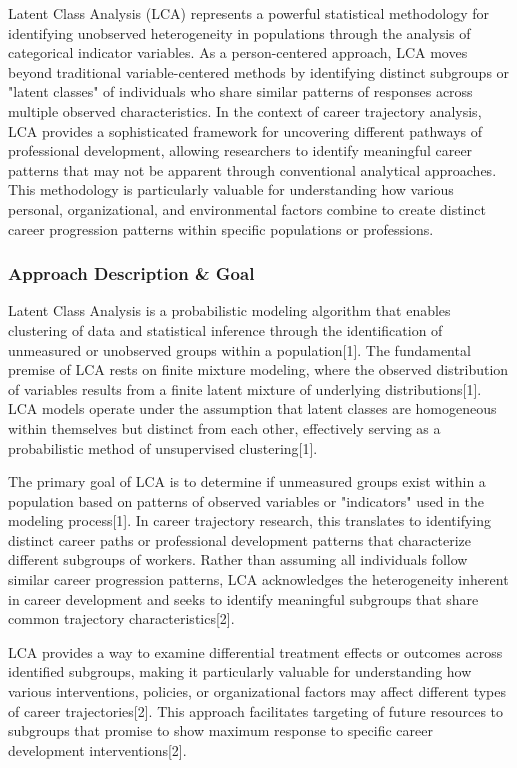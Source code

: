 \documentclass[main.tex]{subfiles}
\begin{document}
Latent Class Analysis (LCA) represents a powerful statistical methodology for identifying unobserved heterogeneity in populations through the analysis of categorical indicator variables. As a person-centered approach, LCA moves beyond traditional variable-centered methods by identifying distinct subgroups or "latent classes" of individuals who share similar patterns of responses across multiple observed characteristics. In the context of career trajectory analysis, LCA provides a sophisticated framework for uncovering different pathways of professional development, allowing researchers to identify meaningful career patterns that may not be apparent through conventional analytical approaches. This methodology is particularly valuable for understanding how various personal, organizational, and environmental factors combine to create distinct career progression patterns within specific populations or professions.

\subsubsection{Approach Description \& Goal}

Latent Class Analysis is a probabilistic modeling algorithm that enables clustering of data and statistical inference through the identification of unmeasured or unobserved groups within a population[1]. The fundamental premise of LCA rests on finite mixture modeling, where the observed distribution of variables results from a finite latent mixture of underlying distributions[1]. LCA models operate under the assumption that latent classes are homogeneous within themselves but distinct from each other, effectively serving as a probabilistic method of unsupervised clustering[1].

The primary goal of LCA is to determine if unmeasured groups exist within a population based on patterns of observed variables or "indicators" used in the modeling process[1]. In career trajectory research, this translates to identifying distinct career paths or professional development patterns that characterize different subgroups of workers. Rather than assuming all individuals follow similar career progression patterns, LCA acknowledges the heterogeneity inherent in career development and seeks to identify meaningful subgroups that share common trajectory characteristics[2].

LCA provides a way to examine differential treatment effects or outcomes across identified subgroups, making it particularly valuable for understanding how various interventions, policies, or organizational factors may affect different types of career trajectories[2]. This approach facilitates targeting of future resources to subgroups that promise to show maximum response to specific career development interventions[2].
\end{document}
